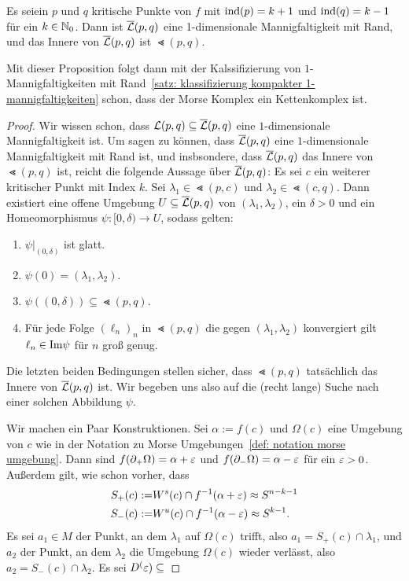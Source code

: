 \begin{prop}
    \label{prop: gebrochene trajektorien sind 1-dim mannigfaltigkeit}
    Es seiein $p$ und $q$ kritische Punkte von $f$ mit ${ \operatorname{ind} } (p) = k + 1$ und ${ \operatorname{ind} } (q) = k - 1$
    für ein $k \in { \mathbb N }_0$. Dann ist ${\overline{\mathcal{L}} } (p, q)$ eine 1-dimensionale Mannigfaltigkeit mit Rand, und das
    Innere von ${\overline{\mathcal{L}} } (p, q)$ ist $\Lt (p, q)$.
\end{prop}

Mit dieser Proposition folgt dann mit der Kalssifizierung von $1$-Mannigfaltigkeiten mit 
Rand~\ref{satz: klassifizierung kompakter 1-mannigfaltigkeiten} schon, dass der Morse Komplex ein
Kettenkomplex ist.

\begin{proof}
    Wir wissen schon, dass ${ \mathcal{L} } (p, q) \subseteq {\overline{\mathcal{L}} }(p, q)$ eine $1$-dimensionale Mannigfaltigkeit ist. 
    Um sagen zu können, dass ${\overline{\mathcal{L}} } (p, q)$ eine $1$-dimensionale Mannigfaltigkeit mit Rand ist, und 
    insbsondere, dass ${\overline{\mathcal{L}} } (p, q)$ das Innere von $\Lt(p, q)$ ist, reicht die folgende Aussage über 
    ${\overline{\mathcal{L}} }(p, q)$:
    Es sei $c$ ein weiterer kritischer Punkt mit Index $k$.
    Sei $\lambda_1 \in \Lt (p, c)$ und $\lambda_2 \in \Lt (c, q)$. Dann existiert eine offene Umgebung
    $U \subseteq {\overline{\mathcal{L}} } (p, q)$ von $(\lambda_1, \lambda_2)$, ein $\delta > 0$ und ein Homeomorphismus
    $\psi \colon [0, \delta) \to U$, sodass gelten: 
    \begin{enumerate}
        \item $\psi|_{(0, \delta)}$ ist glatt.
        \item $\psi(0) = (\lambda_1, \lambda_2)$.
        \item $\psi((0, \delta)) \subseteq \Lt (p, q)$.
        \item Für jede Folge $(\ell_n)_n$ in $\Lt (p, q)$ die gegen $(\lambda_1, \lambda_2)$ konvergiert 
            gilt $\ell_n \in { \operatorname{Im} } \psi$ für $n$ groß genug.
    \end{enumerate} 
    Die letzten beiden Bedingungen stellen sicher, dass $\Lt (p, q)$ tatsächlich das Innere von 
    ${\overline{\mathcal{L}} } (p, q)$ ist.
    Wir begeben uns also auf die (recht lange) Suche nach einer solchen Abbildung $\psi$. 

    Wir machen ein Paar Konstruktionen. Sei $\alpha := f(c)$ und $\Omega(c)$ eine Umgebung von $c$ wie 
    in der Notation zu Morse Umgebungen~\ref{def: notation morse umgebung}. Dann sind 
    $f({ \partial }_+ \Omega) = \alpha + \varepsilon$ und $f({ \partial }_- \Omega) = \alpha - \varepsilon$ für ein $\varepsilon > 0$.
    Außerdem gilt, wie schon vorher, dass 
    \begin{align*}
        S_+ (c) := & { W^s } (c) \cap f^{-1}(\alpha + \varepsilon) \approx S^{n - k - 1} \\
        S_- (c) := & { W^u } (c) \cap f^{-1}(\alpha - \varepsilon) \approx S^{k - 1} .
    \end{align*}
    Es sei $a_1 \in M$ der Punkt, an dem $\lambda_1$ auf $\Omega(c)$ trifft, also 
    $a_1 = S_+ (c) \cap \lambda_1$, und $a_2$ der Punkt, an dem $\lambda_2$ die Umgebung $\Omega (c)$ 
    wieder verlässt, also $a_2 = S_- (c) \cap \lambda_2$. Es sei $D^(\varepsilon) \subseteq $


\end{proof}
